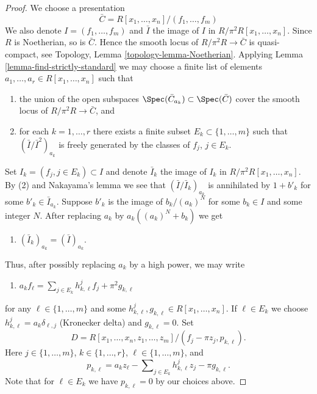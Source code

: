 \begin{proof}
We choose a presentation
$$
\bar C = R[x_1, \ldots, x_n]/(f_1, \ldots, f_m)
$$
We also denote $I = (f_1, \ldots, f_m)$ and $\bar I$ the image of
$I$ in $R/\pi^2R[x_1, \ldots, x_n]$. Since $R$ is Noetherian, so is
$\bar C$. Hence the smooth locus of $R/\pi^2 R \to \bar C$
is quasi-compact, see
Topology, Lemma \ref{topology-lemma-Noetherian}.
Applying
Lemma \ref{lemma-find-strictly-standard}
we may choose a finite list of elements
$a_1, \ldots, a_r \in R[x_1, \ldots, x_n]$ such that
\begin{enumerate}
\item the union of the open subspaces
$\Spec(\bar C_{a_k}) \subset \Spec(\bar C)$
cover the smooth locus of $R/\pi^2 R \to \bar C$, and
\item for each $k = 1, \ldots, r$ there exists a finite subset
$E_k \subset \{1, \ldots, m\}$ such that
$(\bar I/\bar I^2)_{a_k}$ is freely generated by the classes of
$f_j$, $j \in E_k$.
\end{enumerate}
Set $I_k = (f_j, j \in E_k) \subset I$ and denote $\bar I_k$ the
image of $I_k$ in $R/\pi^2R[x_1, \ldots, x_n]$.
By (2) and Nakayama's lemma we see that $(\bar I/\bar I_k)_{a_k}$
is annihilated by $1 + b'_k$ for some $b'_k \in \bar I_{a_k}$.
Suppose $b'_k$ is the image of $b_k/(a_k)^N$ for some $b_k \in I$
and some integer $N$. After replacing $a_k$ by $a_k((a_k)^N + b_k)$ we get
\begin{enumerate}
\item[(3)] $(\bar I_k)_{a_k} = (\bar I)_{a_k}$.
\end{enumerate}
Thus, after possibly replacing $a_k$ by a high power, we may write
\begin{enumerate}
\item[(4)]
$a_k f_\ell = \sum\nolimits_{j \in E_k} h_{k, \ell}^jf_j + \pi^2 g_{k, \ell}$
\end{enumerate}
for any $\ell \in \{1, \ldots, m\}$ and some
$h_{k, \ell}^j, g_{k, \ell} \in R[x_1, \ldots, x_n]$.
If $\ell \in E_k$ we choose $h_{k, \ell}^j = a_k\delta_{\ell, j}$
(Kronecker delta) and $g_{k, \ell} = 0$. Set
$$
D = R[x_1, \ldots, x_n, z_1, \ldots, z_m]/
(f_j - \pi z_j, p_{k, \ell}).
$$
Here $j \in \{1, \ldots, m\}$, $k \in \{1, \ldots, r\}$,
$\ell \in \{1, \ldots, m\}$, and
$$
p_{k, \ell} = a_k z_\ell - \sum\nolimits_{j \in E_k} h_{k, \ell}^j z_j
- \pi g_{k, \ell}.
$$
Note that for $\ell \in E_k$ we have $p_{k, \ell} = 0$ by our choices above.


\end{proof}
